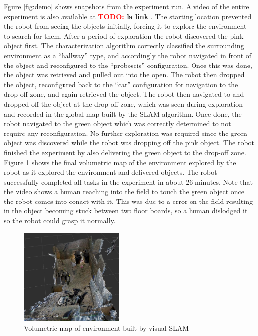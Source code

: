 \documentclass[conference]{IEEEtran}
\newcommand{\TODO}[1]{ {\bf \textcolor{red}{TODO:} #1 }}
\begin{document}
Fgure \ref{fig:demo} shows snapshots from the experiment run. A video of the entire experiment is also available at \TODO{la link}. The starting location prevented the robot from seeing the objects initially, forcing it to explore the environment to search for them. After a period of exploration the robot discovered the pink object first. The characterization algorithm correctly classified the surrounding environment as a ``hallway'' type, and accordingly the robot navigated in front of the object and reconfigured to the ``proboscis'' configuration. Once this was done, the object was retrieved and pulled out into the open. The robot then dropped the object, reconfigured back to the ``car'' configuration for navigation to the drop-off zone, and again retrieved the object. The robot then navigated to and dropped off the object at the drop-off zone, which was seen during exploration and recorded in the global map built by the SLAM algorithm. Once done, the robot navigated to the green object which was correctly determined to not require any reconfiguration. No further exploration was required since the green object was discovered while the robot was dropping off the pink object. The robot finished the experiment by also delivering the green object to the drop-off zone. Figure \ref{fig:octomap} shows the final volumetric map of the environment explored by the robot as it explored the environment and delivered objects. The robot successfully completed all tasks in the experiment in about 26 minutes. Note that the video shows a human reaching into the field to touch the green object once the robot comes into conact with it. This was due to a error on the field resulting in the object becoming stuck between two floor boards, so a human dislodged it so the robot could grasp it normally.

\begin{figure}
\begin{center}
\includegraphics[width=0.45\textwidth]{images/octomap.png}
\caption{Volumetric map of environment built by visual SLAM}
\label{fig:octomap}
\end{center}
\end{figure}
\end{document}
